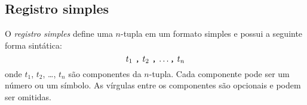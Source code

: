 \documentclass[11pt, brazil]{report}
\begin{document}
%
%
%
%

\subsection{Registro simples}

O {\it registro simples} define uma $n$-tupla em um formato simples
e possui a seguinte forma sintática:
$$\mbox{$t_1$ {\tt,} $t_2$ {\tt,} \dots {\tt,} $t_n$}$$
onde $t_1$, $t_2$, \dots, $t_n$ são componentes da $n$-tupla. Cada
componente pode ser um número ou um símbolo. As vírgulas entre os componentes
são opcionais e podem ser omitidas.

\end{document}
